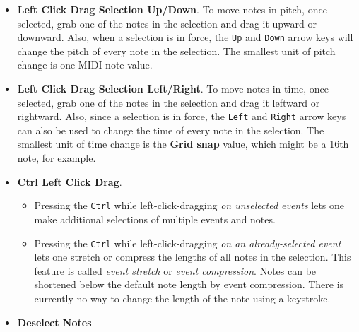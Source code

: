 \begin{itemize}
      \item
         \textbf{Left Click Drag Selection Up/Down}.
         To move notes in pitch, once selected, grab one of the notes in the
         selection and drag it upward or downward.
         Also, when a selection is in force, the
         \texttt{Up} and \texttt{Down} arrow keys will
         change the pitch of every note in the selection.
         The smallest unit of pitch change is one MIDI note value.
      \item
         \textbf{Left Click Drag Selection Left/Right}.
         To move notes in time, once selected, grab one of the notes in the
         selection and drag it leftward or rightward.
         Also, since a selection is in force, the
         \texttt{Left} and \texttt{Right} arrow keys can also
         be used to change the time of every note in the selection.
         The smallest unit of time change is the \textbf{Grid snap} value,
         which might be a 16th note, for example.
      \item
         \textbf{Ctrl Left Click Drag}.
         \begin{itemize}
            \item Pressing the \texttt{Ctrl} while left-click-dragging
               \textsl{on unselected events} lets one make additional
               selections of multiple events and notes.
            \item Pressing the \texttt{Ctrl} while left-click-dragging
               \textsl{on an already-selected event} lets one stretch or
               compress the lengths of all notes in the selection.
               This feature is called \textsl{event stretch}
               or \textsl{event compression}.
               Notes can be shortened below the default note length by event
               compression.  There is currently no way to change the length of
               the note using a keystroke.
         \end{itemize}
      \item {} 
         \textbf{Deselect Notes}
   \end{itemize}

